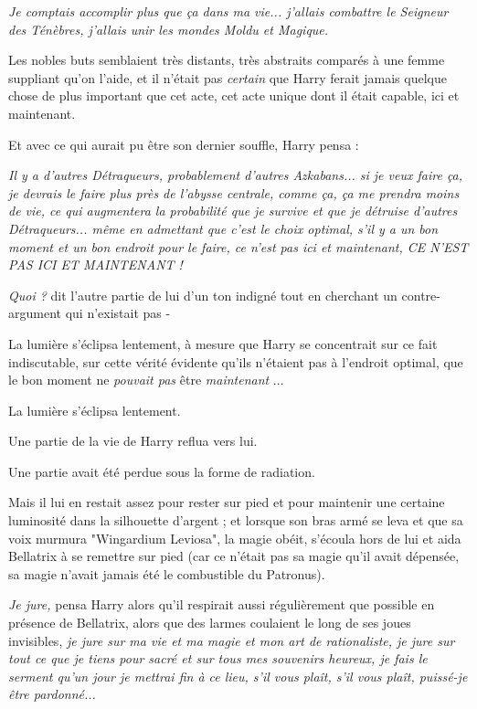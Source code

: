 \emph{Je comptais accomplir plus que ça dans ma vie... j'allais combattre le Seigneur des Ténèbres, j'allais unir les mondes Moldu et Magique.} 

Les nobles buts semblaient très distants, très abstraits comparés à une femme suppliant qu'on l'aide, et il n'était pas \emph{certain}  que Harry ferait jamais quelque chose de plus important que cet acte, cet acte unique dont il était capable, ici et maintenant.

Et avec ce qui aurait pu être son dernier souffle, Harry pensa :

\emph{Il y a d'autres Détraqueurs, probablement d'autres Azkabans... si je veux faire ça, je devrais le faire plus près de l'abysse centrale, comme ça, ça me prendra moins de vie, ce qui augmentera la probabilité que je survive et que je détruise d'autres Détraqueurs... même en admettant que c'est le choix optimal, s'il y a un bon moment et un bon endroit pour le faire, ce n'est pas ici et maintenant, CE N'EST PAS ICI ET MAINTENANT !} 

\emph{Quoi ?}  dit l'autre partie de lui d'un ton indigné tout en cherchant un contre-argument qui n'existait pas -

La lumière s'éclipsa lentement, à mesure que Harry se concentrait sur ce fait indiscutable, sur cette vérité évidente qu'ils n'étaient pas à l'endroit optimal, que le bon moment ne \emph{pouvait pas}  être \emph{maintenant} ...

La lumière s'éclipsa lentement.

Une partie de la vie de Harry reflua vers lui.

Une partie avait été perdue sous la forme de radiation.

Mais il lui en restait assez pour rester sur pied et pour maintenir une certaine luminosité dans la silhouette d'argent ; et lorsque son bras armé se leva et que sa voix murmura "Wingardium Leviosa", la magie obéit, s'écoula hors de lui et aida Bellatrix à se remettre sur pied (car ce n'était pas sa magie qu'il avait dépensée, sa magie n'avait jamais été le combustible du Patronus).

\emph{Je jure,}  pensa Harry alors qu'il respirait aussi régulièrement que possible en présence de Bellatrix, alors que des larmes coulaient le long de ses joues invisibles, \emph{je jure sur ma vie et ma magie et mon art de rationaliste, je jure sur tout ce que je tiens pour sacré et sur tous mes souvenirs heureux, je fais le serment qu'un jour je mettrai fin à ce lieu, s'il vous plaît, s'il vous plaît, puissé-je être pardonné...} 

